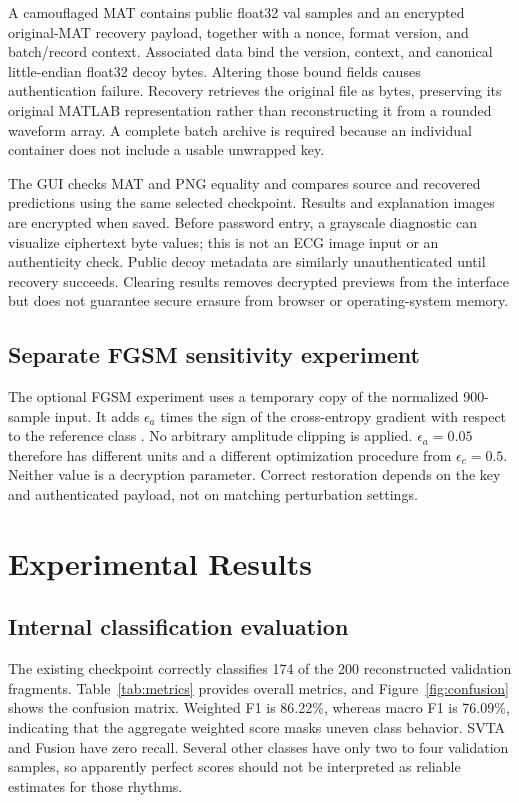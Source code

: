 \documentclass{jpp}
\begin{document}
A camouflaged MAT contains public float32 val samples and an encrypted original-MAT recovery payload, together with a nonce, format version, and batch/record context. Associated data bind the version, context, and canonical little-endian float32 decoy bytes. Altering those bound fields causes authentication failure. Recovery retrieves the original file as bytes, preserving its original MATLAB representation rather than reconstructing it from a rounded waveform array. A complete batch archive is required because an individual container does not include a usable unwrapped key.

The GUI checks MAT and PNG equality and compares source and recovered predictions using the same selected checkpoint. Results and explanation images are encrypted when saved. Before password entry, a grayscale diagnostic can visualize ciphertext byte values; this is not an ECG image input or an authenticity check. Public decoy metadata are similarly unauthenticated until recovery succeeds. Clearing results removes decrypted previews from the interface but does not guarantee secure erasure from browser or operating-system memory.

\subsection{Separate FGSM sensitivity experiment}

The optional FGSM experiment uses a temporary copy of the normalized 900-sample input. It adds $\epsilon_a$ times the sign of the cross-entropy gradient with respect to the reference class \cite{goodfellow2015}. No arbitrary amplitude clipping is applied. $\epsilon_a=0.05$ therefore has different units and a different optimization procedure from $\epsilon_c=0.5$. Neither value is a decryption parameter. Correct restoration depends on the key and authenticated payload, not on matching perturbation settings.

\section{Experimental Results}

\subsection{Internal classification evaluation}

The existing checkpoint correctly classifies 174 of the 200 reconstructed validation fragments. Table~\ref{tab:metrics} provides overall metrics, and Figure~\ref{fig:confusion} shows the confusion matrix. Weighted F1 is 86.22\%, whereas macro F1 is 76.09\%, indicating that the aggregate weighted score masks uneven class behavior. SVTA and Fusion have zero recall. Several other classes have only two to four validation samples, so apparently perfect scores should not be interpreted as reliable estimates for those rhythms.
\end{document}
